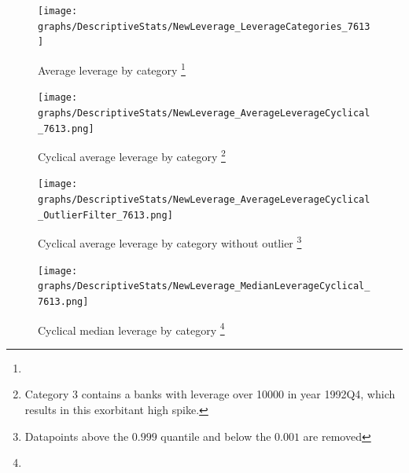\documentclass[12pt, a4paper]{article} %
\begin{document}

\begin{figure}[hbtp]
\begin{minipage}{\textwidth}
\centering
\caption[1]{Average leverage by category \footnote{}}
\texttt{[image: graphs/DescriptiveStats/NewLeverage\_LeverageCategories\_7613]}
\label{fig:averageLeverage_Categories}
\end{minipage}
\end{figure}

\begin{figure}[hbtp]
\begin{minipage}{\textwidth}
\centering
\caption[1]{Cyclical average leverage by category \footnote{Category 3 contains a banks with leverage over 10000 in year 1992Q4, which results in this exorbitant high spike.}}
\texttt{[image: graphs/DescriptiveStats/NewLeverage\_AverageLeverageCyclical\_7613.png]}
\label{fig:averageLeverage_cyclical_Categories}
\end{minipage}
\end{figure}

\begin{figure}[hbtp]
\begin{minipage}{\textwidth}
\centering
\caption[1]{Cyclical average leverage by category without outlier \footnote{Datapoints above the $0.999$ quantile and below the $0.001$ are removed}}
\texttt{[image: graphs/DescriptiveStats/NewLeverage\_AverageLeverageCyclical\_OutlierFilter\_7613.png]}
\label{fig:averageLeverage_cyclical_noOutlier_Categories}
\end{minipage}
\end{figure}


\begin{figure}[hbtp]
\begin{minipage}{\textwidth}
\centering
\caption[1]{Cyclical median leverage by category \footnote{}}
\texttt{[image: graphs/DescriptiveStats/NewLeverage\_MedianLeverageCyclical\_7613.png]}
\label{fig:medianLeverage_cyclical_Categories}
\end{minipage}
\end{figure}
\end{document}
